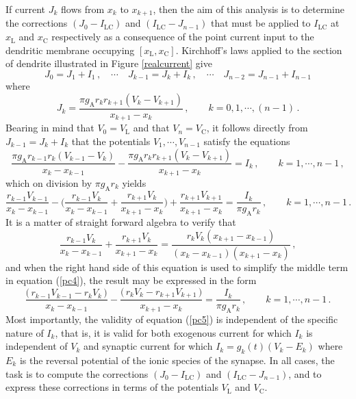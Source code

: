 If current $J_k$ flows from $x_k$ to $x_{k+1}$, then the aim of
this analysis is to determine the corrections
$(J_0-I_\mathrm{LC})$ and $(I_\mathrm{LC}-J_{n-1})$ that must be
applied to $I_\mathrm{LC}$ at $x_\mathrm{L}$ and $x_\mathrm{C}$
respectively as a consequence of the point current input to the
dendritic membrane occupying $[x_\mathrm{L},x_\mathrm{C}]$.
Kirchhoff's laws applied to the section of dendrite illustrated in
Figure \ref{realcurrent} give
\begin{equation}\label{pc2}
J_0=J_1+I_1\,,\quad\cdots\quad J_{k-1}=J_k+I_k\,,\quad\cdots\quad
J_{n-2}=J_{n-1}+I_{n-1}
\end{equation}
where
\begin{equation}\label{pc3}
J_k = \frac{\pi g_\mathrm{A}r_k r_{k+1}(V_k-V_{k+1})}{x_{k+1}-x_k}
\,,\qquad k=0,1,\cdots,(n-1)\,.
\end{equation}
Bearing in mind that $V_0=V_\mathrm{L}$ and that
$V_n=V_\mathrm{C}$, it follows directly from $J_{k-1}=J_k+I_k$
that the potentials $V_1,\cdots, V_{n-1}$ satisfy the equations
\begin{equation}\label{pc4}
\frac{\pi g_\mathrm{A}r_{k-1} r_k(V_{k-1}-V_k)}{x_k-x_{k-1}}
-\frac{\pi g_\mathrm{A}r_k r_{k+1}(V_k-V_{k+1})}
{x_{k+1}-x_k}=I_k\,,\qquad k=1,\cdots,n-1\,,
\end{equation}
which on division by $\pi g_\mathrm{A} r_k$ yields
\begin{equation}\label{pc4}
\frac{r_{k-1} V_{k-1}}{x_k-x_{k-1}}
-\Big(\frac{r_{k-1} V_k}{x_k-x_{k-1}}+
\frac{r_{k+1}V_k}{x_{k+1}-x_k}\Big)
+\frac{r_{k+1}V_{k+1}}{x_{k+1}-x_k}
=\frac{I_k}{\pi g_\mathrm{A} r_k}\,,\qquad k=1,\cdots,n-1\,.
\end{equation}
It is a matter of straight forward algebra to verify that
\[
\frac{r_{k-1} V_k}{x_k-x_{k-1}}+\frac{r_{k+1}V_k}{x_{k+1}-x_k}
=\frac{r_k V_k (x_{k+1}-x_{k-1})}{(x_k-x_{k-1})(x_{k+1}-x_k)}\,,
\]
and when the right hand side of this equation is used to simplify
the middle term in equation (\ref{pc4}), the result may be
expressed in the form
\begin{equation}\label{pc5}
\frac{\big(\,r_{k-1} V_{k-1}-r_k V_k\,\big)}{x_k-x_{k-1}}
-\frac{\big(\,r_k V_k- r_{k+1}V_{k+1}\,\big)}{x_{k+1}-x_k}
=\frac{I_k}{\pi g_\mathrm{A} r_k}\,,\qquad k=1,\cdots,n-1\,.
\end{equation}
Most importantly, the validity of equation (\ref{pc5}) is
independent of the specific nature of $I_k$, that is, it is valid
for both exogenous current for which $I_k$ is independent of $V_k$
and synaptic current for which $I_k=g_k(t)(V_k-E_k)$ where $E_k$
is the reversal potential of the ionic species of the synapse. In
all cases, the task is to compute the corrections
$(J_0-I_\mathrm{LC})$ and $(I_\mathrm{LC}-J_{n-1})$, and to
express these corrections in terms of the potentials
$V_\mathrm{L}$ and $V_\mathrm{C}$.

